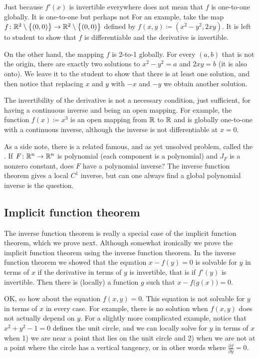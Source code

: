 \begin{example}
Just because $f'(x)$ is invertible everywhere does not
mean that $f$ is
one-to-one globally.  It is  one-to-one but perhaps not
  For an
example, take the map $f \colon {\mathbb{R}}^2 \setminus \bigl\{ (0,0) \bigr\} \to
{\mathbb{R}}^2 \setminus \bigl\{ (0,0) \bigr\}$ defined
by $f(x,y) \coloneqq (x^2-y^2,2xy)$.
It is left to student to show that $f$ is
differentiable and the derivative is invertible.

On the other hand, the mapping $f$ is 2-to-1 globally.  For every
$(a,b)$ that is not the origin, there are exactly two
solutions to $x^2-y^2=a$ and $2xy=b$ (it is also onto).  We leave it to the student
to show that there is at least one solution, and then notice
that replacing $x$ and $y$ with $-x$ and $-y$ we obtain another solution.
\end{example}

The invertibility of the derivative is not a necessary
condition, just sufficient, for having a continuous inverse and being an open
mapping.  For example, the function $f(x) \coloneqq x^3$ is an open mapping from ${\mathbb{R}}$
to ${\mathbb{R}}$ and is globally one-to-one with a continuous inverse, although the
inverse is not differentiable at $x=0$.

\medskip

As a side note, there is a related famous, and as yet unsolved problem,
called the \emph{}.  If $F \colon {\mathbb{R}}^n \to
{\mathbb{R}}^n$ is polynomial (each component is a polynomial) and $J_F$ is a nonzero
constant, does $F$ have a polynomial inverse?
The inverse function theorem gives a local $C^1$ inverse, but can one always
find a global polynomial inverse is the question.

\subsection{Implicit function theorem}

The inverse function theorem is really a special case of the implicit
function theorem, which we prove next.  Although somewhat ironically we 
prove the implicit function theorem using the inverse function theorem.
In the inverse function theorem we showed that
the equation $x-f(y) = 0$ is solvable for $y$ in terms of $x$ if the derivative
in terms of $y$ is invertible, that is if $f'(y)$ is invertible.
Then there is (locally) a
function $g$ such that $x-f\bigl(g(x)\bigr) = 0$.

OK\@, so how about the equation $f(x,y) = 0$.  This equation is
not solvable for $y$ in terms of $x$ in every case.  For example,
there is no solution
when $f(x,y)$ does not actually depend on $y$.  For a slightly more
complicated example, notice that $x^2+y^2-1 = 0$ defines the unit circle, and
we can locally solve for $y$ in terms of $x$ when 1) we are near
a point that lies on the unit circle and 2) when we are not at a point
where the circle has a vertical tangency, or in other words where
$\frac{\partial f}{\partial y} = 0$.

